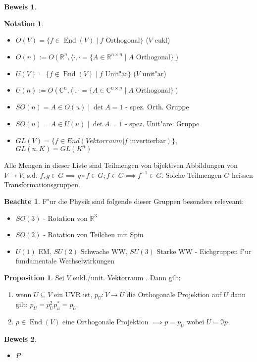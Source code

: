 \documentclass[oneside,fontsize=11pt,paper=a4,BCOR=0mm,DIV=12,automark,headsepline]{scrbook}
\DeclareMathOperator{\mEnd}{End}
\theoremstyle{remark}
\theoremstyle{definition}
\newtheorem*{notte}{Beachte}
\newtheorem*{notation}{Notation}
\newtheorem*{proposition}{Proposition}
\theoremstyle{definition}
\newtheorem*{prof}{Beweis}
\theoremstyle{remark}
\begin{document}
\begin{prof}
  \begin{itemize}
  \end{itemize}
\end{prof}
\begin{notation}
  \begin{itemize}
  \item $O(V)=\{f\in\mEnd (V) \mid f\text{ Orthogonal}\}$ ($V$ eukl)
  \item $O(n):= O(\mathbb{R}^n, \langle{\cdot, \cdot} = \{A\in
    \mathbb{R}^{n\times  n} \mid A \text{ Orthogonal}\})$
  \item $U(V)=\{f\in\mEnd (V) \mid f\text{ Unit"ar}\}$ ($V$ unit"ar)
  \item $U(n):= O(\mathbb{C}^n, \langle{\cdot, \cdot} = \{A\in
    \mathbb{C}^{n\times  n} \mid A \text{ Orthogonal}\})$
  \item $S O(n) = {A\in O(u) \mid \det A = 1}$ - spez. Orth. Gruppe
  \item $S  O(n) = {A\in U(u) \mid \det A = 1}$ - spez. Unit"are. Gruppe
  \item $GL(V)=\{f\in End(Vektorraum | f \text{ invertierbar})\}$, $GL(u, K)=GL(K^n)$
  \end{itemize}

  Alle Mengen in dieser Liste sind Teilmengen von bijektiven Abbildungen von
  $V\rightarrow V$, s.d. $f,g\in G \implies g\circ f \in G; f\in G \implies
  f^{-1}\in G$. Solche Teilmengen $G$ heissen Transformationsgruppen.
\end{notation}

\begin{notte}
  F"ur die Physik sind folgende dieser Gruppen besonders releveant:
  \begin{itemize}
  \item $SO(3)$ - Rotation von $\mathbb{R}^3$
  \item $SO(2)$ - Rotation von Teilchen mit Spin
  \item $U(1)$ EM, $SU(2)$ Schwache WW, $SU(3)$ Starke WW - Eichgruppen f"ur fundamentale Wechselwirkungen
  \end{itemize}
\end{notte}

\begin{proposition}
  Sei $V$ eukl./unit. Vektorraum . Dann gilt:
  \begin{enumerate}
  \item wenn $U\subseteq V$ ein UVR ist, $p_U: V\rightarrow U$ die Orthogonale
    Projektion auf $U$ dann gilt: $p_U=p_U^2 p_u^*= p_U$
    
  \item $p\in \mEnd (V)$ eine Orthogonale Projektion $\implies p = p_U $ wobei
    $U=\Im p$
  \end{enumerate}
\end{proposition}
\begin{prof}
  \begin{itemize}
  \item $P$
  \end{itemize}
\end{prof}
\end{document}
